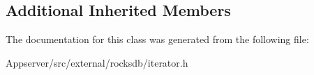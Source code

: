 \subsection*{Additional Inherited Members}


The documentation for this class was generated from the following file\+:\begin{DoxyCompactItemize}
\item 
Appserver/src/external/rocksdb/iterator.\+h\end{DoxyCompactItemize}
